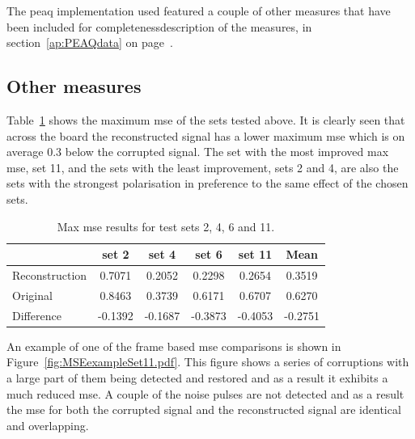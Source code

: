 The \DIFdelbegin {}\DIFdelend \DIFaddbegin \gls{peaq} \DIFaddend implementation used \cite{Loizou2007} \DIFaddbegin {}\DIFaddend featured a couple of other measures that have been included for completeness\DIFdelbegin {}\DIFdelend \DIFaddbegin {}\DIFaddend description of the measures, \DIFaddbegin {}\DIFaddend in section~\ref{ap:PEAQdata} on page~\pageref{ap:PEAQdata}.

\subsection{Other measures}
Table~\ref{tab:MaxMSE} shows the maximum \DIFdelbegin {}\DIFdelend \DIFaddbegin \gls{mse} \DIFaddend of the sets tested above. It is clearly seen that across the board the reconstructed signal has a lower maximum \DIFdelbegin {}\DIFdelend \DIFaddbegin \gls{mse} \DIFaddend which is on average 0.3 below the corrupted signal. The set with the most improved max \DIFdelbegin {}\DIFdelend \DIFaddbegin \gls{mse}\DIFaddend , set 11, and the sets with the least improvement, sets 2 and 4, are also the sets with the strongest polarisation in preference to the same effect of the chosen sets.

\begin{table}\begin{center}
\caption{Max \DIFdelbeginFL {}\DIFdelendFL \DIFaddbeginFL \gls{mse} \DIFaddendFL results for test sets 2, 4, 6 and 11.}
\label{tab:MaxMSE}
\begin{tabular}{|l|c|c|c|c|c|}\hline
                    & set 2     & set 4     & set 6     & set 11    & Mean      \\ \hline
  Reconstruction    & 0.7071    & 0.2052    & 0.2298    & 0.2654    & 0.3519    \\
  Original          & 0.8463    & 0.3739    & 0.6171    & 0.6707    & 0.6270    \\ \hline
  Difference        & -0.1392   & -0.1687   & -0.3873   & -0.4053   & -0.2751    \\
  \hline
\end{tabular}\end{center}\end{table}

An example of one of the frame based \DIFdelbegin {}\DIFdelend \DIFaddbegin \gls{mse} \DIFaddend comparisons is shown in Figure~\ref{fig:MSEexampleSet11.pdf}. This figure shows a series of corruptions with a large part of them being detected and restored and as a result it exhibits a much reduced \DIFdelbegin {}\DIFdelend \DIFaddbegin \gls{mse}\DIFaddend . A couple of the noise pulses are not detected and as a result the \DIFdelbegin {}\DIFdelend \DIFaddbegin \gls{mse} \DIFaddend for both the corrupted signal and the reconstructed signal are identical and overlapping.

